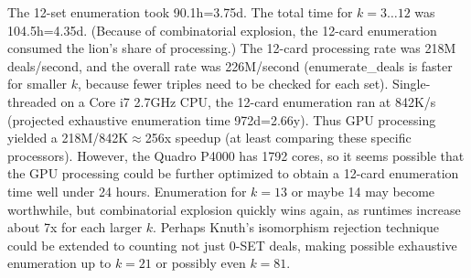 \documentclass[10pt]{amsart}
\newcommand{\EDb}{{\sc enumerate\_deals }}
\begin{document}
The 12-set enumeration took 90.1h=3.75d. The total time for $k=3\ldots 12$ was
104.5h=4.35d. (Because of combinatorial explosion, the 12-card enumeration
consumed the lion's share of processing.) The 12-card processing rate was 218M
deals/second, and the overall rate was 226M/second (\EDb is faster for smaller
$k$, because fewer triples need to be checked for each set). Single-threaded on
a Core i7 2.7GHz CPU, the 12-card enumeration ran at 842K/s (projected
exhaustive enumeration time 972d=2.66y). Thus GPU processing yielded a
218M/842K$\approx$256x speedup (at least comparing these specific processors).
However, the Quadro P4000 has 1792 cores, so it seems possible that the GPU
processing could be further optimized to obtain a 12-card enumeration time well
under 24 hours. Enumeration for $k=13$ or maybe 14 may become worthwhile, but
combinatorial explosion quickly wins again, as runtimes increase about 7x for
each larger $k$. Perhaps Knuth's isomorphism rejection technique could be
extended to counting not just 0-SET deals, making possible exhaustive
enumeration up to $k=21$ or possibly even $k=81$.
\end{document}
